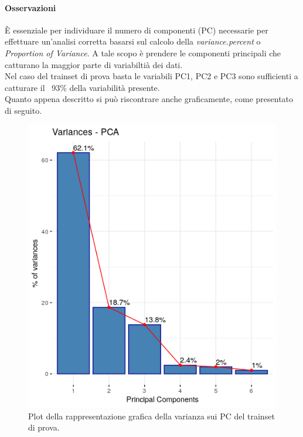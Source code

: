 \paragraph{Osservazioni}
\`E essenziale per individuare il numero di componenti (PC) necessarie per effettuare un'analisi corretta basarsi sul calcolo della \textit{variance.percent} o \textit{Proportion of Variance}. A tale scopo \`e prendere le componenti principali che catturano la maggior parte di variabilti\`a dei dati.\\
Nel caso del trainset di prova basta le variabili PC1, PC2 e PC3 sono sufficienti a catturare il ~93\% della variabilit\`a presente.\\
Quanto appena descritto si pu\`o riscontrare anche graficamente, come presentato di seguito.

\begin{figure}[H]
\centering
	\includegraphics[width=0.60\linewidth]{../../PCA/plot/variances_rete-prova.png}
	\caption{Plot della rappresentazione grafica della varianza sui PC del trainset di prova.}
\end{figure}

